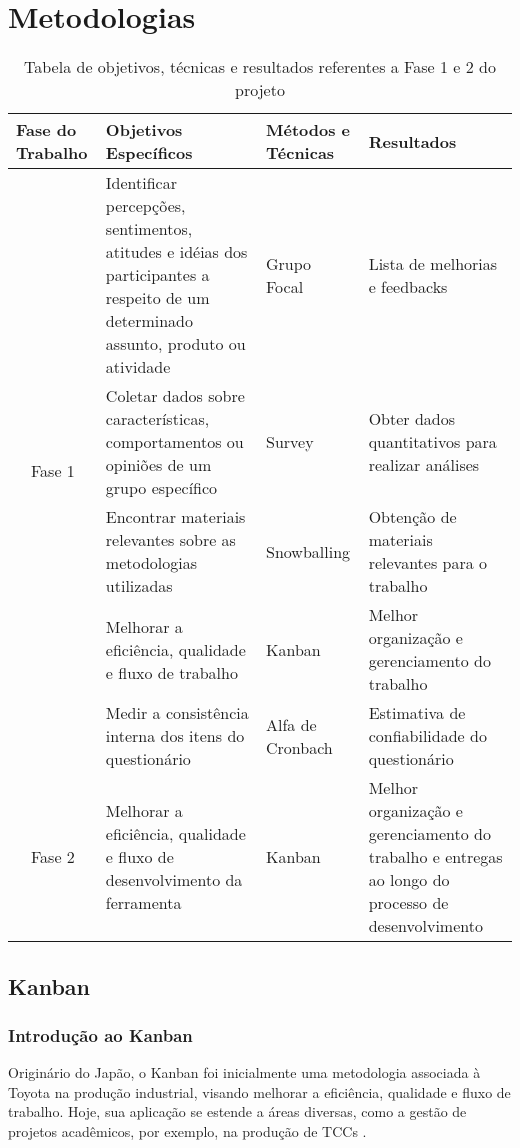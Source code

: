 \chapter[Metodologias]{Metodologias}

\begin{table}[!ht]
    \centering
    \begin{tabularx}{\textwidth}{|X|X|X|X|}
    \hline
        Fase do Trabalho & Objetivos Específicos & Métodos e Técnicas & Resultados \\ \hline
        \multicolumn{1}{c|}{\multirow{5}{*}{Fase 1}} & Identificar percepções, sentimentos, atitudes
        e idéias dos participantes a respeito de um determinado assunto, produto ou atividade & Grupo Focal & Lista de melhorias e feedbacks \\ \cline{2-4}
        & Coletar dados sobre características, comportamentos ou opiniões de um grupo específico & Survey & Obter dados quantitativos para realizar análises \\ \cline{2-4}
        & Encontrar materiais relevantes sobre as metodologias utilizadas & Snowballing & Obtenção de materiais relevantes para o trabalho \\ \cline{2-4}
        & Melhorar a eficiência, qualidade e fluxo de trabalho & Kanban & Melhor organização e gerenciamento do trabalho \\ \cline{2-4}
        & Medir a consistência interna dos itens do questionário & Alfa de Cronbach & Estimativa de confiabilidade do questionário \\ \hline
        \multicolumn{1}{c|}{\multirow{1}{*}{Fase 2}} & Melhorar a eficiência, qualidade e fluxo de desenvolvimento da ferramenta & Kanban & Melhor organização e gerenciamento do trabalho e entregas ao longo do processo de desenvolvimento \\ \hline
    \end{tabularx}
    \caption{Tabela de objetivos, técnicas e resultados referentes a Fase 1 e 2 do projeto}
\end{table}

\section{Kanban}
\subsection{Introdução ao Kanban}
Originário do Japão, o Kanban foi inicialmente uma metodologia associada à Toyota na produção industrial, visando melhorar a eficiência, qualidade e fluxo de trabalho. Hoje, sua aplicação se estende a áreas diversas, como a gestão de projetos acadêmicos, por exemplo, na produção de TCCs \cite{corona2013review}.


